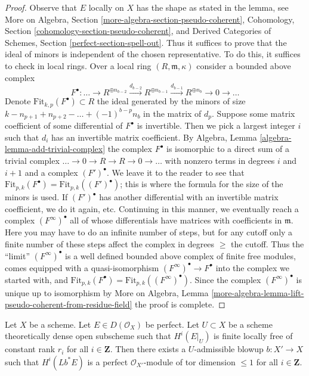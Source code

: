 \begin{proof}
Observe that $E$ locally on $X$ has the shape as stated in the lemma, see
More on Algebra, Section \ref{more-algebra-section-pseudo-coherent},
Cohomology, Section \ref{cohomology-section-pseudo-coherent}, and
Derived Categories of Schemes, Section \ref{perfect-section-spell-out}.
Thus it suffices to prove that the ideal of minors is independent
of the chosen representative. To do this, it suffices to check
in local rings. Over a local ring $(R, \mathfrak m, \kappa)$
consider a bounded above complex
$$
F^\bullet :
\ldots \to
R^{\oplus n_{b - 2}}
\xrightarrow{d_{b - 2}}
R^{\oplus n_{b - 1}}
\xrightarrow{d_{b - 1}}
R^{\oplus n_b} \to 0 \to \ldots
$$
Denote $\text{Fit}_{k, p}(F^\bullet) \subset R$ the ideal generated
by the minors of size $k - n_{p + 1} + n_{p + 2} - \ldots + (-1)^{b - p} n_b$
in the matrix of $d_p$. Suppose some matrix coefficient of some
differential of $F^\bullet$ is invertible. Then we pick a largest
integer $i$ such that $d_i$ has an invertible matrix coefficient.
By Algebra, Lemma \ref{algebra-lemma-add-trivial-complex}
the complex $F^\bullet$ is isomorphic to a direct sum of a trivial complex
$\ldots \to 0 \to R \to R \to 0 \to \ldots$ with nonzero terms
in degrees $i$ and $i + 1$ and a complex $(F')^\bullet$.
We leave it to the reader to see that
$\text{Fit}_{p, k}(F^\bullet) = \text{Fit}_{p, k}((F')^\bullet)$;
this is where the formula for the size of the minors is used.
If $(F')^\bullet$ has another differential with an invertible
matrix coefficient, we do it again, etc.
Continuing in this manner, we eventually reach a complex $(F^\infty)^\bullet$
all of whose differentials have matrices with coefficients
in $\mathfrak m$. Here you may have to do an infinite number
of steps, but for any cutoff only a finite number of these
steps affect the complex in degrees $\geq $ the cutoff.
Thus the ``limit'' $(F^\infty)^\bullet$ is a well defined bounded
above complex of finite free modules, comes equipped
with a quasi-isomorphism $(F^\infty)^\bullet \to F^\bullet$
into the complex we started with, and
$\text{Fit}_{p, k}(F^\bullet) = \text{Fit}_{p, k}((F^\infty)^\bullet)$.
Since the complex $(F^\infty)^\bullet$ is unique up to isomorphism by
More on Algebra, Lemma
\ref{more-algebra-lemma-lift-pseudo-coherent-from-residue-field}
the proof is complete.
\end{proof}

\begin{lemma}
\label{lemma-blowup-complex}
Let $X$ be a scheme. Let $E \in D(\mathcal{O}_X)$ be perfect.
Let $U \subset X$ be a scheme theoretically dense open subscheme
such that $H^i(E|_U)$ is finite locally free of constant rank $r_i$
for all $i \in \mathbf{Z}$.
Then there exists a $U$-admissible blowup $b : X' \to X$ such that
$H^i(Lb^*E)$ is a perfect $\mathcal{O}_{X'}$-module
of tor dimension $\leq 1$ for all $i \in \mathbf{Z}$.
\end{lemma}

